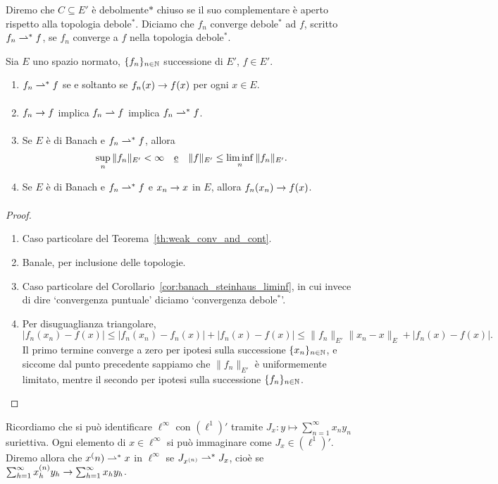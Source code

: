 Diremo che $C \subseteq E'$ è debolmente$*$ chiuso se il suo complementare è aperto rispetto alla topologia debole$^*$. Diciamo che $f_n$ converge debole$^*$ ad $f$, scritto $f_n \rightharpoonup^* f$, se $f_n$ converge a $f$ nella topologia debole$^*$.

\begin{lemma}
	Sia $E$ uno spazio normato, $\{f_n\}_{n \in \mathbb{N}}$ successione di $E'$, $f \in E'$.
	\begin{enumerate}
		\item $f_n \rightharpoonup^* f$ se e soltanto se $f_n(x) \underset{{}}{\rightarrow} f(x)$ per ogni $x \in E$.
		\item $f_n \underset{{}}{\rightarrow} f$ implica $f_n \rightharpoonup f$ implica $f_n \rightharpoonup^* f$.
		\item Se $E$ è di Banach e $f_n \rightharpoonup^* f$, allora
		\begin{equation*}
			\sup_n \|f_n\|_{E'} < \infty \quad\text{\underline{e}}\quad \|f\|_{E'} \leq \liminf_n \|f_n\|_{E'}.
		\end{equation*}
		\item Se $E$ è di Banach e $f_n \rightharpoonup^* f$ e $x_n \underset{{}}{\rightarrow} x$ in $E$, allora $f_n(x_n) \underset{{}}{\rightarrow} f(x)$.
	\end{enumerate}
\end{lemma}
\begin{proof}
	\leavevmode
	\begin{enumerate}
		\item Caso particolare del Teorema~\ref{th:weak_conv_and_cont}.
		\item Banale, per inclusione delle topologie.
		\item Caso particolare del Corollario~\ref{cor:banach_steinhaus_liminf}, in cui invece di dire `convergenza puntuale' diciamo `convergenza debole$^*$'.
		\item Per disuguaglianza triangolare,
		\begin{equation*}
			|f_n(x_n) - f(x)| \leq |f_n(x_n) - f_n(x)| + |f_n(x) - f(x)| \leq \|f_n\|_{E'}\|x_n - x\|_E + |f_n(x) - f(x)|.
		\end{equation*}
		Il primo termine converge a zero per ipotesi sulla successione $\{x_n\}_{n \in \mathbb{N}}$, e siccome dal punto precedente sappiamo che $\|f_n\|_{E'}$ è uniformemente limitato, mentre il secondo per ipotesi sulla successione $\{f_n\}_{n \in \mathbb{N}}$.
	\end{enumerate}
\end{proof}

\begin{example}
	Ricordiamo che si può identificare $\ell^\infty$ con $(\ell^1)'$ tramite $J_x : y \mapsto \sum_{n=1}^\infty x_n y_n$ suriettiva. Ogni elemento di $x \in \ell^\infty$ si può immaginare come $J_x \in (\ell^1)'$. Diremo allora che $x^(n) \rightharpoonup^* x$ in $\ell^\infty$ se $J_{x^{(n)}} \rightharpoonup^* J_x$, cioè se $\sum_{h=1}^\infty x^{(n)}_h y_h \underset{{}}{\rightarrow} \sum_{h=1}^\infty x_hy_h$.
\end{example}

